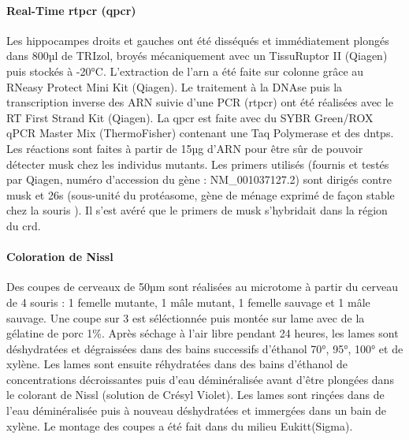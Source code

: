 \paragraph{Real-Time \acrshort{rtpcr} (\acrshort{qpcr})}
\label{par:qPCR}
	Les hippocampes droits et gauches ont été disséqués et immédiatement plongés dans 800µl de TRIzol\textregistered, broyés mécaniquement avec un TissuRuptor II (Qiagen\textregistered) puis stockés à -20°C. L'extraction de l'\acrshort{arn} a été faite sur colonne grâce au RNeasy Protect Mini Kit (Qiagen\textregistered). Le traitement à la DNAse puis la transcription inverse des ARN suivie d'une PCR (\acrshort{rtpcr}) ont été réalisées avec le RT First Strand Kit (Qiagen\textregistered). La \gls{qpcr} est faite avec du SYBR Green/ROX qPCR Master Mix (ThermoFisher\textregistered) contenant une Taq Polymerase et des \glspl{dntp}. Les réactions sont faites à partir de 15µg d'ARN pour être sûr de pouvoir détecter \gls{musk} chez les individus mutants. Les primers utilisés (fournis et testés par Qiagen\textregistered, numéro d'accession du gène : NM\_001037127.2) sont dirigés contre \gls{musk} et \acrshort{26s} (sous-unité du protéasome, gène de ménage exprimé de façon stable chez la souris \cite{Wang2017}). Il s'est avéré que le primers de \gls{musk} s'hybridait dans la région du \gls{crd}.
	
\paragraph{Coloration de Nissl}
\label{par:Nissl}
	Des coupes de cerveaux de 50µm sont réalisées au microtome à partir du cerveau de 4 souris : 1 femelle mutante, 1 mâle mutant, 1 femelle sauvage et 1 mâle sauvage. Une coupe sur 3 est séléctionnée puis montée sur lame avec de la gélatine de porc 1\%. Après séchage à l'air libre pendant 24 heures, les lames sont déshydratées et dégraissées dans des bains successifs d'éthanol 70°, 95°, 100° et de xylène. Les lames sont ensuite réhydratées dans des bains d'éthanol de concentrations décroissantes puis d'eau déminéralisée avant d'être plongées dans le colorant de Nissl (solution de Crésyl Violet).  Les lames sont rinçées dans de l'eau déminéralisée puis à nouveau déshydratées et immergées dans un bain de xylène. Le montage des coupes a été fait dans du milieu Eukitt\textregistered (Sigma).
	
